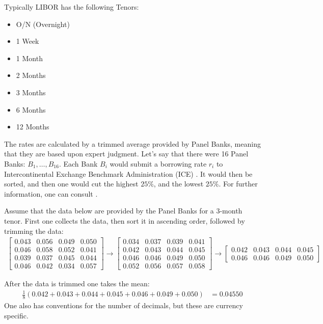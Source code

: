 Typically LIBOR has the following Tenors: 
\begin{itemize}[leftmargin =*]
    \item O/N (Overnight) 
    \item 1 Week 
    \item 1 Month 
    \item 2 Months 
    \item 3 Months 
    \item 6 Months 
    \item 12 Months
\end{itemize}

The rates are calculated by a trimmed average provided by Panel Banks, meaning that they are based upon expert judgment. Let's say that there were 16 Panel Banks: $B_{1}, \dots, B_{16}$. Each Bank $B_{i}$ would submit a borrowing rate $r_{i}$ to Intercontinental Exchange Benchmark Administration (ICE) . It would then be sorted, and then one would cut the highest $25\%$, and the lowest $25\%$. For further information, one can consult \cite{ICE_IBA}.  

\begin{example}
Assume that the data below are provided by the Panel Banks for a 3-month tenor. First one collects the data, then sort it in ascending order, followed by trimming the data: 
\begin{align*}
\begin{bmatrix}
0.043 & 0.056 & 0.049 & 0.050\\
0.046 & 0.058 & 0.052 & 0.041 \\ 
0.039 & 0.037 & 0.045 & 0.044 \\ 
0.046 & 0.042 & 0.034 & 0.057
\end{bmatrix}
\to 
\begin{bmatrix}
0.034 & 0.037 & 0.039 & 0.041\\
0.042 & 0.043 & 0.044 & 0.045 \\ 
0.046 & 0.046 & 0.049 & 0.050 \\ 
0.052 & 0.056 & 0.057 & 0.058
\end{bmatrix} 
\to 
\begin{bmatrix}
0.042 & 0.043 & 0.044 & 0.045 \\ 
0.046 & 0.046 & 0.049 & 0.050 
\end{bmatrix} 
\end{align*}

After the data is trimmed one takes the mean: 
\begin{align*}
\frac{1}{8}\left(
0.042 + 0.043 + 0.044 + 0.045 + 0.046 + 0.049 + 0.050
\right)
&= 
0.04550
\end{align*}
One also has conventions for the number of decimals, but these are currency specific. 
\end{example}


